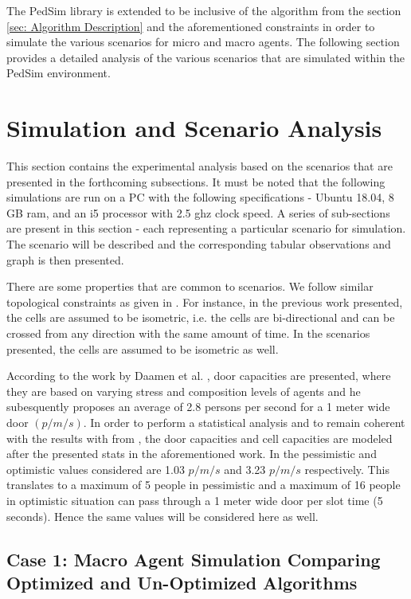 The PedSim library is extended to be inclusive of the algorithm from the section \ref{sec: Algorithm Description} and the aforementioned constraints in order to simulate the various scenarios for micro and macro agents. The following section provides a detailed analysis of the various scenarios that are simulated within the PedSim environment.  

\section{Simulation and Scenario Analysis}
\label{sec: Simulation and Scenario Analysis}

This section contains the experimental analysis based on the scenarios that are presented in the forthcoming subsections. It must be noted that the following simulations are run on a PC with the following specifications - Ubuntu 18.04, 8 GB ram, and an i5 processor with 2.5 ghz clock speed. A series of sub-sections are present in this section - each representing a particular scenario for simulation. The scenario will be described and the corresponding tabular observations and graph is then presented. 

There are some properties that are common to scenarios. We follow similar topological constraints as given in \cite{ref5}. For instance, in the previous work presented, the cells are assumed to be isometric, i.e. the cells are bi-directional and can be crossed from any direction with the same amount of time. In the scenarios presented, the cells are assumed to be isometric as well.

According to the work by Daamen et al. \cite{ref23}, door capacities are presented, where they are based on varying stress and composition levels of agents and he subesquently proposes an average of 2.8 persons per second for a 1 meter wide door $(p/m/s)$. In order to perform a statistical analysis and to remain coherent with the results with from \cite{ref5}, the door capacities and cell capacities are modeled after the presented stats in the aforementioned work. In \cite{ref5} the pessimistic and optimistic values considered are 1.03 $p/m/s$ and 3.23 $p/m/s$ respectively. This translates to a maximum of 5 people in pessimistic and a maximum of 16 people in optimistic situation can pass through a 1 meter wide door per slot time (5 seconds). Hence the same values will be considered here as well.

\subsection{Case 1: Macro Agent Simulation Comparing Optimized and Un-Optimized Algorithms}
\label{sec: Case 1: Macro Agent Simulation Comparing Optimized and Un-Optimized Algorithms}

